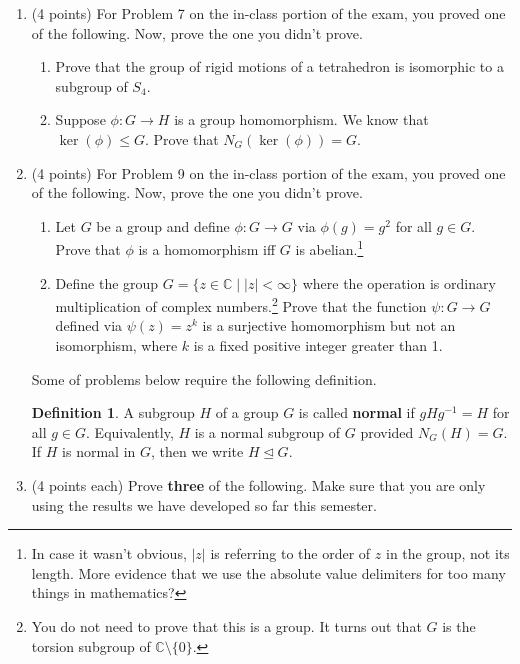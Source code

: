 \documentclass[11pt]{scrartcl}
\theoremstyle{definition}
\newtheorem*{definition*}{Definition}
\begin{document}
\begin{enumerate}

\item (4 points) For Problem 7 on the in-class portion of the exam, you proved one of the following.  Now, prove the one you didn't prove.
\begin{enumerate}[label=\text{(\alph*)}]
\item Prove that the group of rigid motions of a tetrahedron is isomorphic to a subgroup of $S_4$.
\item Suppose $\phi:G\to H$ is a group homomorphism.  We know that $\ker(\phi)\leq G$.  Prove that $N_G(\ker(\phi))=G$.
\end{enumerate}

\item (4 points) For Problem 9 on the in-class portion of the exam, you proved one of the following.  Now, prove the one you didn't prove.
\begin{enumerate}[label=\text{(\alph*)}]
\item Let $G$ be a group and define $\phi:G\to G$ via $\phi(g)=g^2$ for all $g\in G$.  Prove that $\phi$ is a homomorphism iff $G$ is abelian.\footnote{In case it wasn't obvious, $|z|$ is referring to the order of $z$ in the group, not its length.  More evidence that we use the absolute value delimiters for too many things in mathematics?}
\item Define the group $G=\{z\in\mathbb{C}\mid |z|<\infty\}$ where the operation is ordinary multiplication of complex numbers.\footnote{You do not need to prove that this is a group.  It turns out that $G$ is the torsion subgroup of $\mathbb{C}\setminus\{0\}$.} Prove that the function $\psi:G\to G$ defined via $\psi(z)=z^k$ is a surjective homomorphism but not an isomorphism, where $k$ is a fixed positive integer greater than 1.
\end{enumerate}

Some of problems below require the following definition.

\bigskip

\begin{definition*}
A subgroup $H$ of a group $G$ is called \textbf{normal} if $gHg^{-1}=H$ for all $g\in G$.  Equivalently, $H$ is a normal subgroup of $G$ provided $N_G(H)=G$.  If $H$ is normal in $G$, then we write $H\unlhd G$.
\end{definition*}

\item (4 points each) Prove \textbf{three} of the following. Make sure that you are only using the results we have developed so far this semester.


\end{enumerate}
\end{document}
